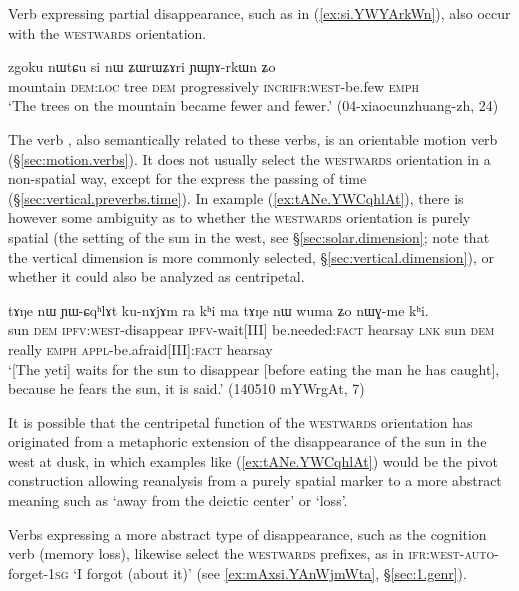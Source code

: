 Verb expressing partial disappearance, such as  in (\ref{ex:si.YWYArkWn}), also occur with the \textsc{westwards} orientation.

\begin{exe}
\ex \label{ex:si.YWYArkWn}
\gll zgoku nɯtɕu si nɯ ʑɯrɯʑɤri ɲɯ\redp{}ɲɤ-rkɯn ʑo \\
mountain \textsc{dem}:\textsc{loc} tree \textsc{dem} progressively \textsc{incr}\redp{}\textsc{ifr}:\textsc{west}-be.few \textsc{emph} \\
\glt `The trees on the mountain became fewer and fewer.' (04-xiaocunzhuang-zh, 24)
\end{exe} 

The verb , also semantically related to these verbs, is an orientable motion verb (§\ref{sec:motion.verbs}). It does not usually select the \textsc{westwards} orientation in a non-spatial way, except for the express the passing of time (§\ref{sec:vertical.preverbs.time}). In example (\ref{ex:tANe.YWCqhlAt}), there is however some ambiguity as to whether the \textsc{westwards} orientation is purely spatial (the setting of the sun in the west, see §\ref{sec:solar.dimension}; note that the vertical dimension is more commonly selected, §\ref{sec:vertical.dimension}), or whether it could also be analyzed as centripetal.
 
\begin{exe}
\ex \label{ex:tANe.YWCqhlAt}
\gll  tɤŋe nɯ ɲɯ-ɕqʰlɤt ku-nɤjɤm ra kʰi ma tɤŋe nɯ wuma ʑo nɯɣ-me kʰi.  \\
sun \textsc{dem} \textsc{ipfv}:\textsc{west}-disappear \textsc{ipfv}-wait[III] be.needed:\textsc{fact} hearsay \textsc{lnk} sun \textsc{dem} really \textsc{emph} \textsc{appl}-be.afraid[III]:\textsc{fact} hearsay \\
\glt `[The yeti] waits for the sun to disappear [before eating the man he has caught], because he fears the sun, it is said.' (140510 mYWrgAt, 7)
\end{exe} 

It is possible that the centripetal function of the \textsc{westwards} orientation has originated from a metaphoric extension of the disappearance of the sun in the west at dusk, in which examples like (\ref{ex:tANe.YWCqhlAt}) would be the pivot construction allowing reanalysis from a purely spatial marker to a more abstract meaning such as `away from the deictic center' or `loss'.

Verbs expressing a more abstract type of disappearance, such as the cognition verb  (memory loss), likewise select the \textsc{westwards} prefixes, as in  \textsc{ifr}:\textsc{west}-\textsc{auto}-forget-\textsc{1sg} `I forgot (about it)' (see \ref{ex:mAxsi.YAnWjmWta}, §\ref{sec:1.genr}).

